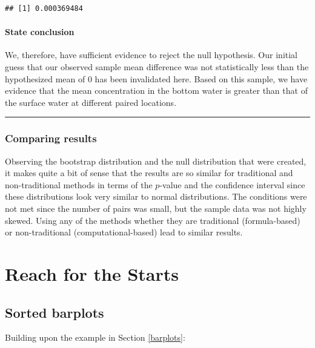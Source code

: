 \documentclass[]{tufte-book}
\newenvironment{Shaded}{\begin{snugshade}}{\end{snugshade}}
\newcommand{\KeywordTok}[1]{\textcolor[rgb]{0.13,0.29,0.53}{\textbf{{#1}}}}
\newcommand{\StringTok}[1]{\textcolor[rgb]{0.31,0.60,0.02}{{#1}}}
\newcommand{\NormalTok}[1]{{#1}}
\let\oldrule=\rule
\renewcommand{\rule}[1]{\oldrule{\linewidth}}
\begin{document}
\begin{verbatim}
## [1] 0.000369484
\end{verbatim}

\subsubsection{State conclusion}\label{state-conclusion-4}

We, therefore, have sufficient evidence to reject the null hypothesis.
Our initial guess that our observed sample mean difference was not
statistically less than the hypothesized mean of 0 has been invalidated
here. Based on this sample, we have evidence that the mean concentration
in the bottom water is greater than that of the surface water at
different paired locations.

\begin{center}\rule{0.5\linewidth}{\linethickness}\end{center}

\subsection{Comparing results}\label{comparing-results-4}

Observing the bootstrap distribution and the null distribution that were
created, it makes quite a bit of sense that the results are so similar
for traditional and non-traditional methods in terms of the \(p\)-value
and the confidence interval since these distributions look very similar
to normal distributions. The conditions were not met since the number of
pairs was small, but the sample data was not highly skewed. Using any of
the methods whether they are traditional (formula-based) or
non-traditional (computational-based) lead to similar results.

\chapter{Reach for the Starts}\label{appendixC}

\section{Sorted barplots}\label{sorted-barplots}

Building upon the example in Section \ref{barplots}:

\begin{Shaded}
\end{Shaded}
\end{document}
